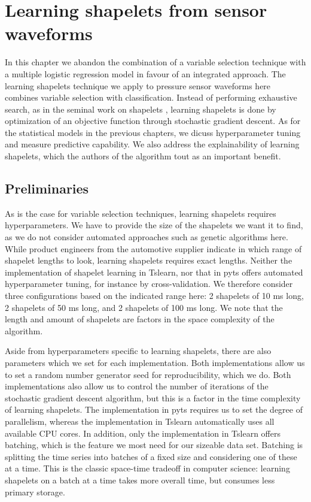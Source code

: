 \chapter{Learning shapelets from sensor waveforms}

In this chapter we abandon the combination of a variable selection technique with a multiple logistic regression model in favour of an integrated approach.
The learning shapelets technique we apply to pressure sensor waveforms here combines variable selection with classification.
Instead of performing exhaustive search, as in the seminal work on shapelets \citep{DBLP:conf/kdd/YeK09}, learning shapelets is done by optimization of an objective function through stochastic gradient descent.
As for the statistical models in the previous chapters, we dicuss hyperparameter tuning and measure predictive capability.
We also address the explainability of learning shapelets, which the authors of the algorithm tout as an important benefit.

\section{Preliminaries}

As is the case for variable selection techniques, learning shapelets requires hyperparameters.
We have to provide the size of the shapelets we want it to find, as we do not consider automated approaches such as genetic algorithms here.
While product engineers from the automotive supplier indicate in which range of shapelet lengths to look, learning shapelets requires exact lengths.
Neither the implementation of shapelet learning in Tslearn, nor that in pyts offers automated hyperparameter tuning, for instance by cross-validation.
We therefore consider three configurations based on the indicated range here: 2 shapelets of 10 ms long, 2 shapelets of 50 ms long, and 2 shapelets of 100 ms long.
We note that the length and amount of shapelets are factors in the space complexity of the algorithm.

Aside from hyperparameters specific to learning shapelets, there are also parameters which we set for each implementation.
Both implementations allow us to set a random number generator seed for reproducibility, which we do.
Both implementations also allow us to control the number of iterations of the stochastic gradient descent algorithm, but this is a factor in the time complexity of learning shapelets.
The implementation in pyts requires us to set the degree of parallelism, whereas the implementation in Tslearn automatically uses all available CPU cores.
In addition, only the implementation in Tslearn offers batching, which is the feature we most need for our sizeable data set.
Batching is splitting the time series into batches of a fixed size and considering one of these at a time.
This is the classic space-time tradeoff in computer science: learning shapelets on a batch at a time takes more overall time, but consumes less primary storage.

